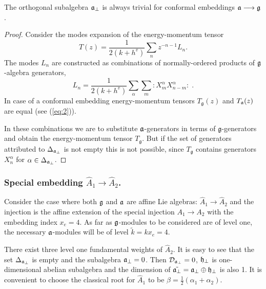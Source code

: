 \begin{mynote} The orthogonal subalgebra $\mathfrak{a}_{\bot}$ is always trivial
for conformal embeddings $\mathfrak{a}\longrightarrow \mathfrak{g}$.
\begin{proof}
Consider the modes expansion of the energy-momentum tensor
\begin{equation*}
\label{eq:47}
  T(z)=\frac{1}{2(k+h^v)}\sum_n z^{-n-1}L_n.
\end{equation*}
The modes $L_n$ are constructed as combinations of normally-ordered products of $\mathfrak{g}$-algebra generators,
\begin{equation*}
\label{eq:48}
  L_n=\frac{1}{2(k+h^v)}\sum_{\alpha}\sum_m:X^{\alpha}_m X^{\alpha}_{n-m}: \; .
\end{equation*}
In case of a conformal embedding energy-momentum tensors $T_{\mathfrak{g}}(z)$ and $T_{\mathfrak{a}}(z)$ are
equal (see (\ref{eq:2})).

In these combinations we are to substitute  $\mathfrak{a}$-generators in terms of $\mathfrak{g}$-generators
and obtain the energy-momentum tensor $T_{\mathfrak{g}}$.
But if the set of generators attributed to $\Delta_{\mathfrak{a}_{\bot}}$ is not empty this is not possible,
since $T_{\mathfrak{g}}$ contains generators $X^{\alpha}_n$ for $\alpha\in \Delta_{\mathfrak{a}_{\bot}}$.
\end{proof}
\end{mynote}



\subsubsection{Special embedding $\hat{A}_1\rightarrow\hat{A}_2$.}
\label{sec:spec-embedd-hata_1s}

Consider the case where both $\mathfrak{g}$ and $\mathfrak{a}$ are affine Lie algebras:
$\hat{A}_1 \rightarrow \hat{A}_2$ and the injection is the affine extension of the
special injection $A_1 \rightarrow A_2$ with the embedding index $x_e=4$.
As far as $\mathfrak{g}$-modules to be considered are of level one,
the necessary $\mathfrak{a}$-modules will be of level $\tilde{k}=kx_e=4$.

There exist three level one fundamental weights of $\hat{A}_2$.
It is easy to see that the set $\Delta_{ \mathfrak{a}_{\bot} }$ is empty and the subalgebra $\mathfrak{a}_{\bot}=0$.
Then ${\cal D}_{\mathfrak{a}_{\bot}}=0$, $\mathfrak{h}_{\perp}$ is one-dimensional abelian subalgebra and
the dimension of $\tilde{\mathfrak{a}_{\bot}}=\mathfrak{a}_{\bot}\oplus \mathfrak{h}_{\perp}$ is also 1.
It is convenient to choose the classical root for $\hat{A}_1$ to be
$\beta=\frac{1}{2}(\alpha_1+\alpha_2)$.

